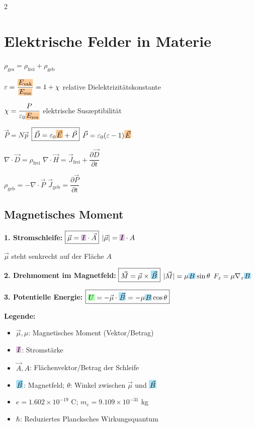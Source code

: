 \documentclass[10pt,a4paper]{article}
\newcommand{\ec}[1]{{\setlength\fboxsep{1pt}\colorbox{green!35}{\ensuremath{#1}}}}
\newcommand{\icc}[1]{{\setlength\fboxsep{1pt}\colorbox{violet!25}{\ensuremath{#1}}}}
\newcommand{\efc}[1]{{\setlength\fboxsep{1pt}\colorbox{orange!40}{\ensuremath{#1}}}}
\newcommand{\bfc}[1]{{\setlength\fboxsep{1pt}\colorbox{cyan!35}{\ensuremath{#1}}}}
\begin{document}
\begin{multicols}{2}
\section{Elektrische Felder in Materie}

$\rho_{\text{ges}}=\rho_{\text{frei}}+\rho_{\text{geb}}$

$\varepsilon=\dfrac{\efc{E_{\text{vak}}}}{\efc{E_{\text{res}}}}=1+\chi$ \quad relative Dielektrizitätskonstante

$\chi=\dfrac{P}{\varepsilon_0 \efc{E_{\text{res}}}}$ \quad elektrische Suszeptibilität

$\boxed{\vec{P}=N\vec{p}}$ \quad $\boxed{\vec{D}=\varepsilon_0\efc{\vec{E}}+\vec{P}}$ \quad $\vec{P}=\varepsilon_0(\varepsilon-1)\efc{\vec{E}}$

$\boxed{\nabla\cdot\vec{D}=\rho_{\text{frei}}}$ \quad $\nabla\cdot\vec{H}=\vec{J}_{\text{frei}}+\dfrac{\partial\vec{D}}{\partial t}$

$\boxed{\rho_{\text{geb}}=-\nabla\cdot\vec{P}}$ \quad $\boxed{\vec{J}_{\text{geb}}=\dfrac{\partial\vec{P}}{\partial t}}$

\subsection{Magnetisches Moment}

\textbf{1. Stromschleife:}
$\boxed{\vec{\mu}=\icc{I}\cdot\vec{A}}$ \quad $|\vec{\mu}|=\icc{I}\cdot A$

$\vec{\mu}$ steht senkrecht auf der Fläche $A$

\textbf{2. Drehmoment im Magnetfeld:}
$\boxed{\vec{M}=\vec{\mu}\times\bfc{\vec{B}}}$ \quad $|\vec{M}|=\mu \bfc{B}\sin\theta$ \quad $F_z=\mu\nabla_z \bfc{B}$

\textbf{3. Potentielle Energie:}
$\boxed{\ec{U}=-\vec{\mu}\cdot\bfc{\vec{B}}=-\mu \bfc{B}\cos\theta}$

\textbf{Legende:}
\begin{itemize}
  \item $\vec{\mu},\mu$: Magnetisches Moment (Vektor/Betrag)
  \item $\icc{I}$: Stromstärke
  \item $\vec{A},A$: Flächenvektor/Betrag der Schleife
  \item $\bfc{\vec{B}}$: Magnetfeld; $\theta$: Winkel zwischen $\vec{\mu}$ und $\bfc{\vec{B}}$
  \item $e=1.602\times10^{-19}$ C; $m_e=9.109\times10^{-31}$ kg
  \item $\hbar$: Reduziertes Plancksches Wirkungsquantum
\end{itemize}

\end{multicols}
\end{document}
